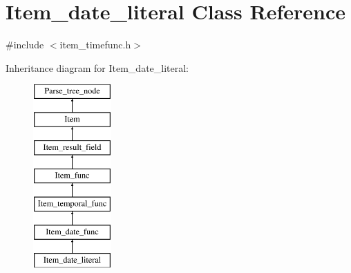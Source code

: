\hypertarget{classItem__date__literal}{}\section{Item\+\_\+date\+\_\+literal Class Reference}
\label{classItem__date__literal}


{\ttfamily \#include $<$item\+\_\+timefunc.\+h$>$}

Inheritance diagram for Item\+\_\+date\+\_\+literal\+:\begin{figure}[H]
\begin{center}
\leavevmode
\includegraphics[height=7.000000cm]{classItem__date__literal}
\end{center}
\end{figure}
